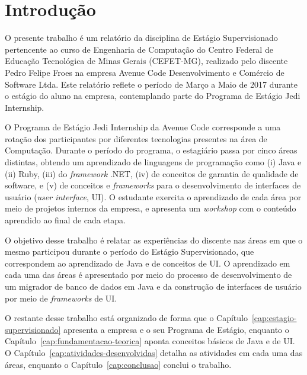 \chapter{Introdução}
\label{cap:introducao}

O presente trabalho é um relatório da disciplina de Estágio Supervisionado pertencente ao curso de Engenharia de Computação do Centro Federal de Educação Tecnológica de Minas Gerais (CEFET-MG), realizado pelo discente Pedro Felipe Froes na empresa Avenue Code Desenvolvimento e Comércio de Software Ltda. Este relatório reflete o período de Março a Maio de 2017 durante o estágio do aluno na empresa, contemplando parte do Programa de Estágio Jedi Internship.

O Programa de Estágio Jedi Internship da Avenue Code corresponde a uma rotação dos participantes por diferentes tecnologias presentes na área de Computação. Durante o período do programa, o estagiário passa por cinco áreas distintas, obtendo um aprendizado de linguagens de programação como (i) Java e (ii) Ruby, (iii) do \textit{framework} .NET, (iv) de conceitos de garantia de qualidade de software, e (v) de conceitos e \textit{frameworks} para o desenvolvimento de interfaces de usuário (\textit{user interface}, UI). O estudante exercita o aprendizado de cada área por meio de projetos internos da empresa, e apresenta um \textit{workshop} com o conteúdo aprendido ao final de cada etapa.

O objetivo desse trabalho é relatar as experiências do discente nas áreas em que o mesmo participou durante o período do Estágio Supervisionado, que correspondem ao aprendizado de Java e de conceitos de UI. O aprendizado em cada uma das áreas é apresentado por meio do processo de desenvolvimento de um migrador de banco de dados em Java e da construção de interfaces de usuário por meio de \textit{frameworks} de UI.

O restante desse trabalho está organizado de forma que o Capítulo~\ref{cap:estagio-supervisionado} apresenta a empresa e o seu Programa de Estágio, enquanto o Capítulo~\ref{cap:fundamentacao-teorica} aponta conceitos básicos de Java e de UI. O Capítulo~\ref{cap:atividades-desenvolvidas} detalha as atividades em cada uma das áreas, enquanto o Capítulo~\ref{cap:conclusao} conclui o trabalho.
